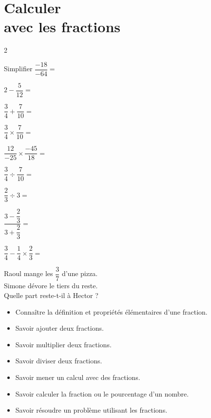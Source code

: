 \documentclass[nocrop]{sesamanuel_guyon}
\begin{document}
	
	\frontmatter
	
	\mainmatter
	
	\themaN
	
	\chapter{Calculer\\ avec les fractions}
	\label{S01}
	\begin{autoeval}
	\begin{itemize}
	\end{itemize}
	\end{autoeval}
	
	
	\begin{prerequis}
		\small
			\begin{itemize}
		\item	Connaître la définition et propriétés élémentaires d'une fraction.\par
\item	Savoir ajouter deux fractions.\par
	\item Savoir multiplier deux fractions.\par
	\item Savoir diviser deux fractions. \par
	\item Savoir mener un calcul avec des fractions. \par
	\item  Savoir calculer la fraction ou le pourcentage d'un nombre. \par
	 \item Savoir résoudre un problème utilisant les fractions.\par	
		\end{itemize}
	\end{prerequis}
	
\end{document}
